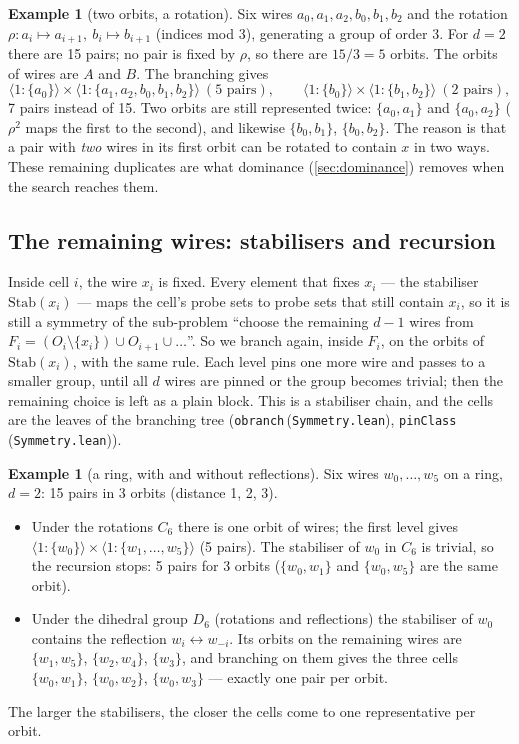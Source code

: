 \documentclass[11pt,a4paper]{article}
\theoremstyle{definition}
\newtheorem{example}[theorem]{Example}
\theoremstyle{remark}
\newcommand{\code}[1]{\texttt{\small #1}}
\newcommand{\lean}[2]{\code{#1}\,(\code{#2})}
\newcommand{\cellof}[2]{\langle #1 \mathbin{:} #2\rangle}
\newcommand{\Stab}{\mathrm{Stab}}
\begin{document}
\begin{example}[two orbits, a rotation]\label{ex:c3}
Six wires $a_0,a_1,a_2,b_0,b_1,b_2$ and the rotation $\rho: a_i\mapsto a_{i+1},\ b_i\mapsto
b_{i+1}$ (indices mod 3), generating a group of order 3.  For $d=2$ there are 15 pairs; no
pair is fixed by $\rho$, so there are $15/3 = 5$ orbits.  The orbits of wires are $A$ and
$B$.  The branching gives
\[
\cellof{1}{\{a_0\}}\times\cellof{1}{\{a_1,a_2,b_0,b_1,b_2\}}\ (5\text{ pairs}),\qquad
\cellof{1}{\{b_0\}}\times\cellof{1}{\{b_1,b_2\}}\ (2\text{ pairs}),
\]
7 pairs instead of 15.  Two orbits are still represented twice: $\{a_0,a_1\}$ and
$\{a_0,a_2\}$ ($\rho^2$ maps the first to the second), and likewise $\{b_0,b_1\}$,
$\{b_0,b_2\}$.  The reason is that a pair with \emph{two} wires in its first orbit can be
rotated to contain $x$ in two ways.  These remaining duplicates are what dominance
(\cref{sec:dominance}) removes when the search reaches them.
\end{example}

\subsection{The remaining wires: stabilisers and recursion}

Inside cell $i$, the wire $x_i$ is fixed.  Every element that fixes $x_i$ --- the stabiliser
$\Stab(x_i)$ --- maps the cell's probe sets to probe sets that still contain $x_i$, so it is
still a symmetry of the sub-problem ``choose the remaining $d-1$ wires from $F_i =
(O_i\setminus\{x_i\})\cup O_{i+1}\cup\dots$''.  So we branch again, inside $F_i$, on the
orbits of $\Stab(x_i)$, with the same rule.  Each level pins one more wire and passes to a
smaller group, until all $d$ wires are pinned or the group becomes trivial; then the
remaining choice is left as a plain block.  This is a stabiliser chain, and the cells are
the leaves of the branching tree (\lean{obranch}{Symmetry.lean}, \lean{pinClass}{Symmetry.lean}).

\begin{example}[a ring, with and without reflections]\label{ex:ring}
Six wires $w_0,\dots,w_5$ on a ring, $d=2$: 15 pairs in 3 orbits (distance 1, 2, 3).
\begin{itemize}[leftmargin=*]
\item Under the rotations $C_6$ there is one orbit of wires; the first level gives
  $\cellof{1}{\{w_0\}}\times\cellof{1}{\{w_1,\dots,w_5\}}$ (5 pairs).  The stabiliser of
  $w_0$ in $C_6$ is trivial, so the recursion stops: 5 pairs for 3 orbits ($\{w_0,w_1\}$ and
  $\{w_0,w_5\}$ are the same orbit).
\item Under the dihedral group $D_6$ (rotations and reflections) the stabiliser of $w_0$
  contains the reflection $w_i\leftrightarrow w_{-i}$.  Its orbits on the remaining wires are
  $\{w_1,w_5\}$, $\{w_2,w_4\}$, $\{w_3\}$, and branching on them gives the three cells
  $\{w_0,w_1\}$, $\{w_0,w_2\}$, $\{w_0,w_3\}$ --- exactly one pair per orbit.
\end{itemize}
The larger the stabilisers, the closer the cells come to one representative per orbit.
\end{example}
\end{document}
